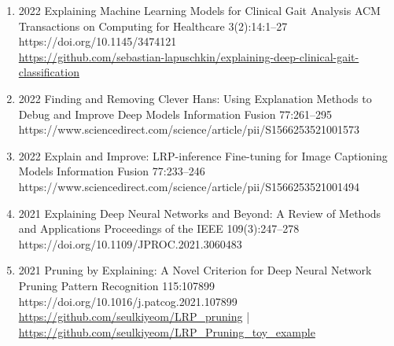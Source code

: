 {\begin{enumerate}
    \item {}
                        {2022}
                        {Explaining Machine Learning Models for Clinical Gait Analysis}
                        {ACM Transactions on Computing for Healthcare}
                        {3(2):14:1--27}
                        {https://doi.org/10.1145/3474121}
                        {\\\href{https://github.com/sebastian-lapuschkin/explaining-deep-clinical-gait-classification}{https://github.com/sebastian-lapuschkin/explaining-deep-clinical-gait-classification}}


    \item {}
                        {2022}
                        {Finding and Removing Clever Hans: Using Explanation Methods to Debug and Improve Deep Models}
                        {Information Fusion}
                        {77:261--295}
                        {https://www.sciencedirect.com/science/article/pii/S1566253521001573}


    \item {}
                       {2022}
                       {Explain and Improve: LRP-inference Fine-tuning for Image Captioning Models}
                       {Information Fusion}
                       {77:233--246}
                       {https://www.sciencedirect.com/science/article/pii/S1566253521001494}

    \item {}
                        {2021}
                        {Explaining Deep Neural Networks and Beyond: A Review of Methods and Applications}
                        {Proceedings of the IEEE}
                        {109(3):247--278}
                        {https://doi.org/10.1109/JPROC.2021.3060483}

    \item {}
                        {2021}
                        {Pruning by Explaining: A Novel Criterion for Deep Neural Network Pruning}
                        {Pattern Recognition}
                        {115:107899}
                        {https://doi.org/10.1016/j.patcog.2021.107899}
                        {\\\href{https://github.com/seulkiyeom/LRP_pruning}{https://github.com/seulkiyeom/LRP\_pruning}
                         | \href{https://github.com/seulkiyeom/LRP_Pruning_toy_example}{https://github.com/seulkiyeom/LRP\_Pruning\_toy\_example}}


\end{enumerate}}
